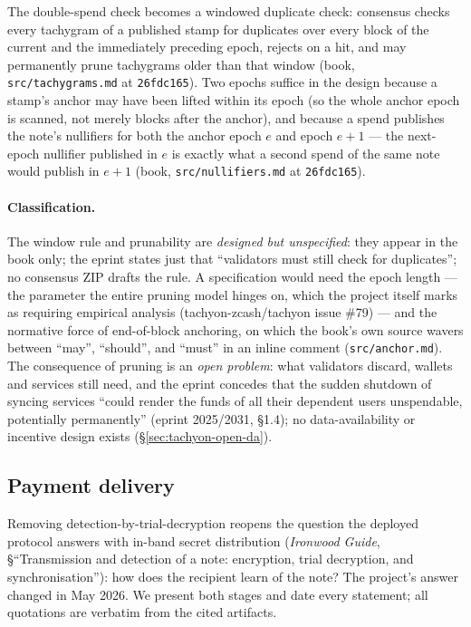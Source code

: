 \documentclass[11pt,a4paper]{article}
\theoremstyle{definition}
\begin{document}
The double-spend check becomes a windowed duplicate check: consensus checks
every tachygram of a published stamp for duplicates over every block of the
current and the immediately preceding epoch, rejects on a hit, and may
permanently prune tachygrams older than that window (book,
\texttt{src/tachygrams.md} at \texttt{26fdc165}). Two epochs suffice in the
design because a stamp's anchor may have been lifted within its epoch (so
the whole anchor epoch is scanned, not merely blocks after the anchor), and
because a spend publishes the note's nullifiers for both the anchor epoch
$e$ and epoch $e + 1$ --- the next-epoch nullifier published in $e$ is
exactly what a second spend of the same note would publish in $e + 1$
(book, \texttt{src/nullifiers.md} at \texttt{26fdc165}).

\paragraph{Classification.} The window rule and prunability are
\emph{designed but unspecified}: they appear in the book only; the eprint
states just that ``validators must still check for duplicates''; no
consensus ZIP drafts the rule. A specification would need the epoch length
--- the parameter the entire pruning model hinges on, which the project
itself marks as requiring empirical analysis (tachyon-zcash/tachyon issue
\#79) --- and the normative force of end-of-block anchoring, on which the
book's own source wavers between ``may'', ``should'', and ``must'' in an
inline comment (\texttt{src/anchor.md}). The consequence of
pruning is an \emph{open problem}: what validators discard, wallets and
services still need, and the eprint concedes that the sudden shutdown of
syncing services ``could render the funds of all their dependent users
unspendable, potentially permanently'' (eprint 2025/2031, \S1.4); no
data-availability or incentive design exists (\S\ref{sec:tachyon-open-da}).

\subsection{Payment delivery}\label{sec:tachyon-payments}

Removing detection-by-trial-decryption reopens the question the deployed
protocol answers with in-band secret distribution (\emph{Ironwood Guide},
\S``Transmission and detection of a note: encryption, trial decryption, and
synchronisation''): how does the recipient learn of the note? The project's
answer changed in May 2026. We present both stages and date every statement;
all quotations are verbatim from the cited artifacts.
\end{document}
